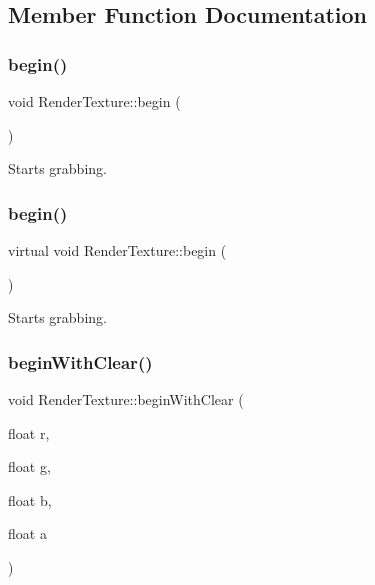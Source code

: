 \subsection{Member Function Documentation}
\mbox{\label{classRenderTexture_ad56dff1562ea63017c74f358261fc3ef}} 
\subsubsection{\texorpdfstring{begin()}{begin()}\hspace{0.1cm}{\footnotesize\ttfamily [1/2]}}
{\footnotesize\ttfamily void Render\+Texture\+::begin (\begin{DoxyParamCaption}{ }\end{DoxyParamCaption})\hspace{0.3cm}{\ttfamily [virtual]}}

Starts grabbing. \mbox{\label{classRenderTexture_a24a91b875c53b5344c64d8d8c5145b8f}} 
\subsubsection{\texorpdfstring{begin()}{begin()}\hspace{0.1cm}{\footnotesize\ttfamily [2/2]}}
{\footnotesize\ttfamily virtual void Render\+Texture\+::begin (\begin{DoxyParamCaption}{ }\end{DoxyParamCaption})\hspace{0.3cm}{\ttfamily [virtual]}}

Starts grabbing. \mbox{\label{classRenderTexture_a43ec79669c64cfdabfca4106f4323ba8}} 
\subsubsection{\texorpdfstring{begin\+With\+Clear()}{beginWithClear()}\hspace{0.1cm}{\footnotesize\ttfamily [1/6]}}
{\footnotesize\ttfamily void Render\+Texture\+::begin\+With\+Clear (\begin{DoxyParamCaption}\item[{float}]{r,  }\item[{float}]{g,  }\item[{float}]{b,  }\item[{float}]{a }\end{DoxyParamCaption})\hspace{0.3cm}{\ttfamily [virtual]}}

